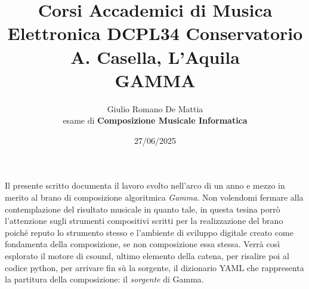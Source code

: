 \documentclass[a4paper,12pt]{article}
\title{Corsi Accademici di Musica Elettronica DCPL34 Conservatorio A. Casella, L'Aquila \\ \fontsize{14}{17}\bfseries\uppercase{Gamma}}
\author{Giulio Romano De Mattia \\ esame di \bfseries{Composizione Musicale Informatica} }
\date{27/06/2025}
\begin{document}
\maketitle
\thispagestyle{empty}

\begin{center}
    \vspace{1cm}
    \textbf{\fontsize{12}{15}\selectfont{Sommario}}
\end{center}

Il presente scritto documenta il lavoro svolto nell'arco di un anno e mezzo in merito al brano di composizione algoritmica \textit{Gamma}. Non volendomi fermare 
alla contemplazione del risultato musicale in quanto tale, in questa tesina porrò l'attenzione sugli strumenti compositivi scritti per la realizzazione 
del brano poiché reputo lo strumento stesso e l'ambiente di sviluppo digitale creato come fondamenta della composizione, se non composizione essa stessa. 
Verrà così esplorato il motore di csound, ultimo elemento della catena, per risalire poi al codice python, per arrivare fin sù la sorgente, il dizionario YAML che rappresenta la partitura della composizione: il \textit{sorgente} di Gamma.



\newpage
\tableofcontents  

\newpage



\newpage %


\end{document}

